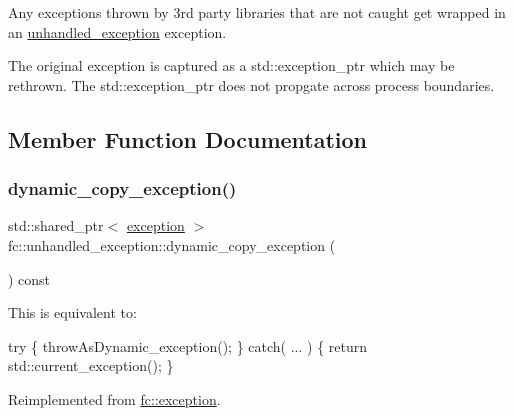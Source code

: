 Any exceptions thrown by 3rd party libraries that are not caught get wrapped in an \mbox{\hyperlink{classfc_1_1unhandled__exception}{unhandled\+\_\+exception}} exception. 

The original exception is captured as a std\+::exception\+\_\+ptr which may be rethrown. The std\+::exception\+\_\+ptr does not propgate across process boundaries. 

\subsection{Member Function Documentation}
\mbox{\label{classfc_1_1unhandled__exception_a7946c956fb83ac7167173be9fdcac3e8}} 
\subsubsection{\texorpdfstring{dynamic\+\_\+copy\+\_\+exception()}{dynamic\_copy\_exception()}}
{\footnotesize\ttfamily std\+::shared\+\_\+ptr$<$ \mbox{\hyperlink{classfc_1_1exception}{exception}} $>$ fc\+::unhandled\+\_\+exception\+::dynamic\+\_\+copy\+\_\+exception (\begin{DoxyParamCaption}{ }\end{DoxyParamCaption}) const\hspace{0.3cm}{\ttfamily [virtual]}}

This is equivalent to\+: 
\begin{DoxyCode}
\textcolor{keywordflow}{try} \{ throwAsDynamic\_exception(); \}
\textcolor{keywordflow}{catch}( ... ) \{ \textcolor{keywordflow}{return} std::current\_exception(); \}
\end{DoxyCode}
 

Reimplemented from \mbox{\hyperlink{classfc_1_1exception_a38ac38d910ba13a339ce5855a51c9127}{fc\+::exception}}.

\mbox{\label{classfc_1_1unhandled__exception_a8177e0f7154591583154cf4e4ccf0c9e}} 
